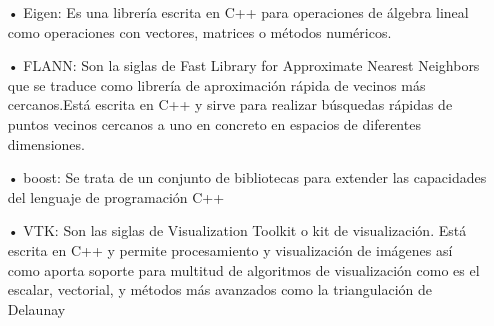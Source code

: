 \begin{itemize}
\item[•]Eigen: Es una librería escrita en C++ para operaciones de álgebra lineal como operaciones con vectores, matrices o métodos numéricos.
\item[•]FLANN: Son la siglas de Fast Library for Approximate Nearest Neighbors que se traduce como librería de aproximación rápida de vecinos más cercanos.Está escrita en C++ y sirve para realizar búsquedas rápidas de puntos vecinos cercanos a uno en concreto en espacios de diferentes dimensiones.
\item[•]boost: Se trata de un conjunto de bibliotecas para extender las capacidades del lenguaje de programación C++ 
\item[•]VTK: Son las siglas de Visualization Toolkit o kit de visualización. Está escrita en C++ y permite procesamiento y visualización de imágenes así como aporta soporte para multitud de algoritmos de visualización como es el escalar, vectorial, y métodos más avanzados como la triangulación de Delaunay
\end{itemize}









